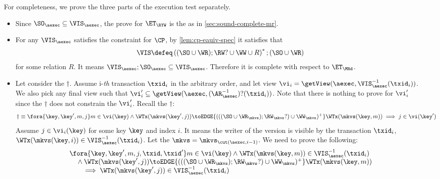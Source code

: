     
For completeness, we prove the three parts of the execution test separately.
\begin{itemize}
\item Since \( \SO_\aexec \subseteq \VIS_\aexec  \), the prove for \( \ET_\RYW \) is the as in \cref{sec:sound-complete-mr}.
\item For any \( \VIS_\aexec \)  satisfies the constraint for \( \CP \), by \cref{lem:cp-eauiv-spec} it satisfies that 
\[
    \VIS \defeq \left( (\SO \cup \WR ) ; \RW? \cup \WW \cup R \right)^* ; (\SO \cup \WR )
\]
for some relation \( R \).
It means \( \VIS_\aexec ; \SO_\aexec \subseteq \VIS_\aexec \).
Therefore it is complete with respect to \( \ET_\MRd \).

\item Let consider the \( \dagger \).
Assume i-\emph{th} transaction \( \txid_i \) in the arbitrary order,
and let view \( \vi_{i} = \getView(\aexec, \VIS^{-1}_{\aexec}(\txid_{i}) ) \).
We also pick any final view such that \( \vi'_{i} \subseteq \getView(\aexec, (\AR^{-1}_{\aexec})?(\txid_{i}) ) \).
Note that there is nothing to prove for \( \vi'_i \) since the \( \dagger \) does not constrain the \( \vi'_i \).
Recall the \( \dagger \):
\[
\dagger  \equiv 
        \fora{\key, \key', m, j}
             m \in \vi(\key)  \wedge \WTx(\mkvs(\key', j)) \toEDGE{(((\SO \cup \WR_{\mkvs}) ; \RW_{\mkvs}?) \cup \WW_{\mkvs})^{+}} \WTx(\mkvs(\key, m))
         \implies j \in \vi(\key')  
\]
Assume \( j \in \vi_i(\key) \) for some key \(\key \) and index \( i \).
It means the writer of the version is visible by the transaction \( \txid_i\),
\ie \( \WTx(\mkvs(\key,i)) \in \VIS^{-1}_{\aexec}(\txid_{i}) \).
Let the \( \mkvs = \mkvs_{\cut(\aexec, i-1)} \).
We need to prove the following:
\begin{gather}
    \label{equ:cp-complete-arvis}
    \begin{array}{@{}l@{}}
        \fora{\key, \key', m, j, \txid, \txid'} 
        m \in \vi(\key) 
        \land \WTx(\mkvs(\key,m)) \in \VIS_\aexec^{-1}(\txid_i) \\
        \quad {} \land \WTx(\mkvs(\key', j)) \toEDGE{(((\SO \cup \WR_{\mkvs}) ; \RW_{\mkvs}?) \cup \WW_{\mkvs})^{+}} \WTx(\mkvs(\key, m)) \\
            \qquad \implies \WTx(\mkvs(\key',j)) \in \VIS_\aexec^{-1}(\txid_i)
    \end{array}
\end{gather}

\end{itemize}
